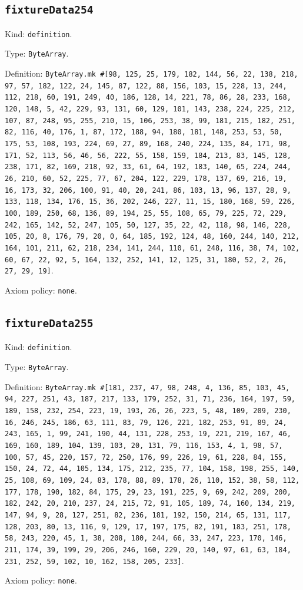 \documentclass[11pt]{article}
\begin{document}
\subsection*{\texttt{fixtureData254}}
\noindent Kind: \texttt{definition}.\par
\noindent Type: \texttt{ByteArray}.\par
\noindent Definition: \texttt{ByteArray.mk \#[98, 125, 25, 179, 182, 144, 56, 22, 138, 218, 97, 57, 182, 122, 24, 145, 87, 122, 88, 156, 103, 15, 228, 13, 244, 112, 218, 60, 191, 249, 40, 186, 128, 14, 221, 78, 86, 28, 233, 168, 120, 148, 5, 42, 229, 93, 131, 60, 129, 101, 143, 238, 224, 225, 212, 107, 87, 248, 95, 255, 210, 15, 106, 253, 38, 99, 181, 215, 182, 251, 82, 116, 40, 176, 1, 87, 172, 188, 94, 180, 181, 148, 253, 53, 50, 175, 53, 108, 193, 224, 69, 27, 89, 168, 240, 224, 135, 84, 171, 98, 171, 52, 113, 56, 46, 56, 222, 55, 158, 159, 184, 213, 83, 145, 128, 238, 171, 82, 169, 218, 92, 33, 61, 64, 192, 183, 140, 65, 224, 244, 26, 210, 60, 52, 225, 77, 67, 204, 122, 229, 178, 137, 69, 216, 19, 16, 173, 32, 206, 100, 91, 40, 20, 241, 86, 103, 13, 96, 137, 28, 9, 133, 118, 134, 176, 15, 36, 202, 246, 227, 11, 15, 180, 168, 59, 226, 100, 189, 250, 68, 136, 89, 194, 25, 55, 108, 65, 79, 225, 72, 229, 242, 165, 142, 52, 247, 105, 50, 127, 35, 22, 42, 118, 98, 146, 228, 105, 20, 8, 176, 79, 20, 0, 64, 185, 192, 124, 48, 160, 244, 140, 212, 164, 101, 211, 62, 218, 234, 141, 244, 110, 61, 248, 116, 38, 74, 102, 60, 67, 22, 92, 5, 164, 132, 252, 141, 12, 125, 31, 180, 52, 2, 26, 27, 29, 19]}.\par
\noindent Axiom policy: \texttt{none}.\par
\subsection*{\texttt{fixtureData255}}
\noindent Kind: \texttt{definition}.\par
\noindent Type: \texttt{ByteArray}.\par
\noindent Definition: \texttt{ByteArray.mk \#[181, 237, 47, 98, 248, 4, 136, 85, 103, 45, 94, 227, 251, 43, 187, 217, 133, 179, 252, 31, 71, 236, 164, 197, 59, 189, 158, 232, 254, 223, 19, 193, 26, 26, 223, 5, 48, 109, 209, 230, 16, 246, 245, 186, 63, 111, 83, 79, 126, 221, 182, 253, 91, 89, 24, 243, 165, 1, 99, 241, 190, 44, 131, 228, 253, 19, 221, 219, 167, 46, 169, 160, 189, 104, 139, 103, 20, 131, 79, 116, 153, 4, 1, 98, 57, 100, 57, 45, 220, 157, 72, 250, 176, 99, 226, 19, 61, 228, 84, 155, 150, 24, 72, 44, 105, 134, 175, 212, 235, 77, 104, 158, 198, 255, 140, 25, 108, 69, 109, 24, 83, 178, 88, 89, 178, 26, 110, 152, 38, 58, 112, 177, 178, 190, 182, 84, 175, 29, 23, 191, 225, 9, 69, 242, 209, 200, 182, 242, 20, 210, 237, 24, 215, 72, 91, 105, 189, 74, 160, 134, 219, 147, 94, 9, 28, 127, 251, 82, 236, 181, 192, 150, 214, 65, 131, 117, 128, 203, 80, 13, 116, 9, 129, 17, 197, 175, 82, 191, 183, 251, 178, 58, 243, 220, 45, 1, 38, 208, 180, 244, 66, 33, 247, 223, 170, 146, 211, 174, 39, 199, 29, 206, 246, 160, 229, 20, 140, 97, 61, 63, 184, 231, 252, 59, 102, 10, 162, 158, 205, 233]}.\par
\noindent Axiom policy: \texttt{none}.\par
\end{document}
